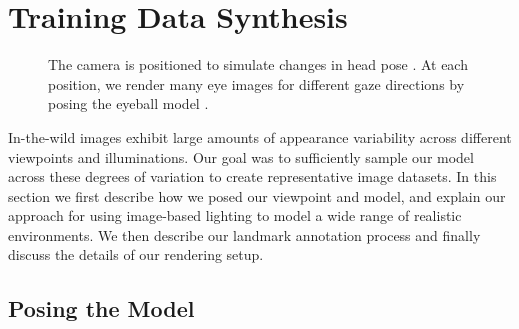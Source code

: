 
\section{Training Data Synthesis}

\begin{figure}
	\captionsetup[subfigure]{labelformat=empty} %
    \captionsetup{subrefformat=parens} %
    \centering
    \begin{subfigure}[t]{0.48\columnwidth}
        \caption{}\label{fig:cam_pos_spher_coords}
    \end{subfigure}
    \hfill
    \begin{subfigure}[t]{0.48\columnwidth}
        \caption{}\label{fig:cam_pos_example_renders}
    \end{subfigure}
    \par\vspace{-28pt}
    \caption{The camera is positioned to simulate changes in head pose . At each position, we render many eye images for different gaze directions by posing the eyeball model .}
    \label{fig:cam_pos}
\end{figure}

In-the-wild images exhibit large amounts of appearance variability across different viewpoints and illuminations.
Our goal was to sufficiently sample our model across these degrees of variation to create representative image datasets.
In this section we first describe how we posed our viewpoint and model, and explain our approach for using image-based lighting \cite{debevec2002image} to model a wide range of realistic environments.
We then describe our landmark annotation process and finally discuss the details of our rendering setup.

\subsection{Posing the Model}

